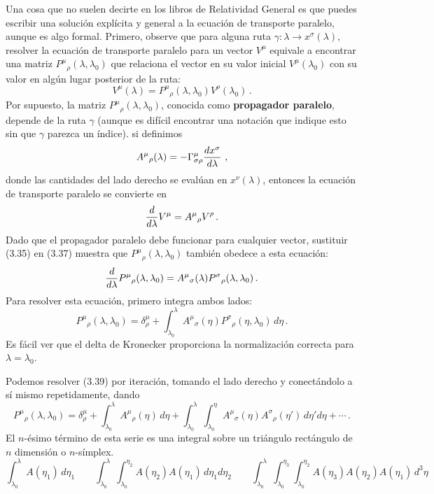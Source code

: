\documentclass[11pt,b5paper,openany,twoside]{book}
\begin{document}
Una cosa que no suelen decirte en los libros de Relatividad General es que puedes escribir una solución explícita y general a la ecuación de transporte paralelo, aunque es algo formal.
Primero, observe que para alguna ruta $\gamma :\lambda \rightarrow x^\sigma(\lambda)$, resolver la ecuación de transporte paralelo para un vector $V^\mu$ equivale a encontrar una matriz $P^\mu{}_\rho(\lambda,\lambda_0)$ que relaciona el vector en su valor inicial $V^\mu(\lambda_0)$ con su valor en algún lugar posterior de la ruta:
\begin{equation}
V^\mu(\lambda) = P^\mu{}_\rho(\lambda,\lambda_0)V^\rho(\lambda_0)
\,.\label{3.35}
\end{equation}
Por supuesto, la matriz $P^\mu{}_\rho(\lambda,\lambda_0)$, conocida como {\bf propagador paralelo}, depende de la ruta $\gamma$ (aunque es difícil encontrar una notación que indique esto sin que $\gamma$ parezca un índice).
si definimos
\begin{equation}
A^\mu{}_\rho(\lambda) = -\Gamma^\mu_{\sigma\rho}
{{dx^\sigma}\over{d \lambda}}\ ,\label{3.36}
\end{equation}
donde las cantidades del lado derecho se evalúan en $x^\nu(\lambda)$, entonces la ecuación de transporte paralelo se convierte en
\begin{equation}
{{d}\over{d\lambda}}V^\mu = A^\mu{}_\rho V^\rho\,.\label{3.37}
\end{equation}
Dado que el propagador paralelo debe funcionar para cualquier vector, sustituir (3.35) en (3.37) muestra que $P^\mu{}_\rho(\lambda,\lambda_0)$ también obedece a esta ecuación:
\begin{equation}
{{d}\over{d\lambda}}P^\mu{}_\rho(\lambda,\lambda_0) =
A^\mu{}_\sigma(\lambda) P^\sigma{}_\rho(\lambda,\lambda_0)
\,.\label{3.38}
\end{equation}
Para resolver esta ecuación, primero integra ambos lados:
\begin{equation}
P^\mu{}_\rho(\lambda,\lambda_0)=\delta^\mu_\rho
+\int^\lambda_{\lambda_0} A^\mu{}_\sigma(\eta)
P^\sigma{}_\rho(\eta,\lambda_0)\, d\eta\,.\label{3.39}
\end{equation}
Es fácil ver que el delta de Kronecker proporciona la normalización correcta para $\lambda=\lambda_0$.

Podemos resolver (3.39) por iteración, tomando el lado derecho y conectándolo a sí mismo repetidamente, dando
\begin{equation}
P^\mu{}_\rho(\lambda,\lambda_0)=\delta^\mu_\rho
+\int^\lambda_{\lambda_0} A^\mu{}_\rho(\eta) \, d\eta
+\int^\lambda_{\lambda_0} \int^\eta_{\lambda_0}
A^\mu{}_\sigma(\eta) A^\sigma{}_\rho(\eta')\, d\eta' d\eta
+\cdots\,.\label{3.40}
\end{equation}
El $n$-ésimo término de esta serie es una integral sobre un triángulo rectángulo de $n$ dimensión o $n$-símplex.
\begin{equation*}
\int^\lambda_{\lambda_0} A(\eta_1) \, d\eta_1 \qquad
\int^\lambda_{\lambda_0} \int^{\eta_2}_{\lambda_0}
A(\eta_2) A(\eta_1)\, d\eta_1 d\eta_2 \qquad
\int^\lambda_{\lambda_0} \int^{\eta_3}_{\lambda_0}\int^{\eta_2}_{\lambda_0}
A(\eta_3) A(\eta_2) A(\eta_1)\, d^3\eta
\end{equation*}
\end{document}
